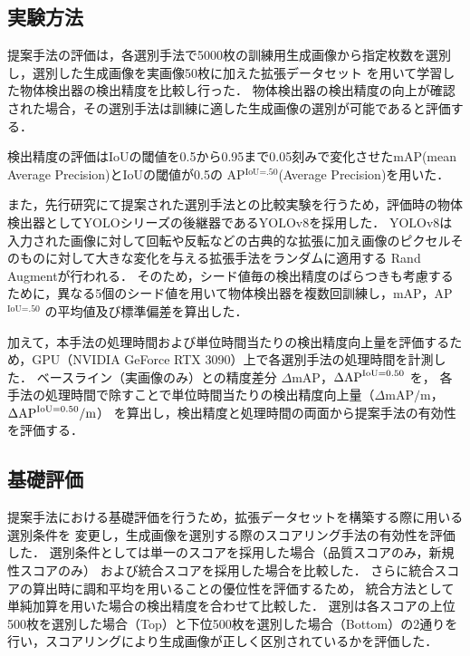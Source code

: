 \documentclass[Japanese]{dicomopapers}
\begin{document}
  \subsection{実験方法}
  
  提案手法の評価は，各選別手法で5000枚の訓練用生成画像から指定枚数を選別し，選別した生成画像を実画像50枚に加えた拡張データセット
  を用いて学習した物体検出器の検出精度を比較し行った．
  物体検出器の検出精度の向上が確認された場合，その選別手法は訓練に適した生成画像の選別が可能であると評価する．

  検出精度の評価はIoUの閾値を0.5から0.95まで0.05刻みで変化させたmAP(mean Average Precision)とIoUの閾値が0.5の
  AP${}^\text{IoU=.50}$(Average Precision)を用いた．

  また，先行研究にて提案された選別手法との比較実験を行うため，評価時の物体検出器としてYOLO\cite{redmon2016you}シリーズの後継器であるYOLOv8\cite{yolov8_ultralytics}を採用した．
  YOLOv8は入力された画像に対して回転や反転などの古典的な拡張に加え画像のピクセルそのものに対して大きな変化を与える拡張手法をランダムに適用する
  Rand Augment\cite{cubuk2020randaugment}が行われる．
  そのため，シード値毎の検出精度のばらつきも考慮するために，異なる5個のシード値を用いて物体検出器を複数回訓練し，mAP，AP${}^\text{IoU=.50}$
  の平均値及び標準偏差を算出した．

  加えて，本手法の処理時間および単位時間当たりの検出精度向上量を評価するため，GPU（NVIDIA GeForce RTX 3090）上で各選別手法の処理時間を計測した．
  ベースライン（実画像のみ）との精度差分 \(\Delta\mathrm{mAP}\)，\(\Delta\mathrm{AP}^{\rm IoU=0.50}\) を，
  各手法の処理時間で除すことで単位時間当たりの検出精度向上量（\(\Delta\mathrm{mAP}/\mathrm{m}\)，\(\Delta\mathrm{AP}^{\rm IoU=0.50}/\mathrm{m}\)）
  を算出し，検出精度と処理時間の両面から提案手法の有効性を評価する．
  \subsection{基礎評価}

  提案手法における基礎評価を行うため，拡張データセットを構築する際に用いる選別条件を
  変更し，生成画像を選別する際のスコアリング手法の有効性を評価した．
  選別条件としては単一のスコアを採用した場合（品質スコアのみ，新規性スコアのみ）
  および統合スコアを採用した場合を比較した．
  さらに統合スコアの算出時に調和平均を用いることの優位性を評価するため，
  統合方法として単純加算を用いた場合の検出精度を合わせて比較した．
  選別は各スコアの上位500枚を選別した場合（Top）と下位500枚を選別した場合（Bottom）の2通りを
  行い，スコアリングにより生成画像が正しく区別されているかを評価した．
  
\end{document}
